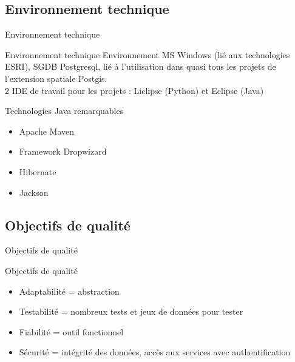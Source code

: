 \documentclass[utf8,compress]{beamer}
\begin{document}
\subsection{Environnement technique}
\begin{frame}{Environnement technique}
\begin{block}{Environnement technique}
	Environnement MS Windows (lié aux technologies ESRI),
	SGDB Postgresql, lié à l'utilisation dans quasi tous les projets de l'extension spatiale Postgis.\\
	2 IDE de travail pour les projets : Liclipse (Python) et Eclipse (Java)\\
	
\end{block}
\begin{block}{Technologies Java remarquables }
\begin{itemize}
\item Apache Maven
\item Framework \og Dropwizard \fg
\item Hibernate
\item Jackson
\end{itemize} 
\end{block}
\end{frame}
\subsection{Objectifs de qualité}
\begin{frame}{Objectifs de qualité}
\begin{block}{Objectifs de qualité}
\begin{itemize}
\item Adaptabilité = abstraction
\item Testabilité = nombreux tests et jeux de données pour tester
\item Fiabilité = outil fonctionnel
\item Sécurité = intégrité des données, accès aux services avec authentification
\end{itemize}
\end{block}
\end{frame}

\end{document}
